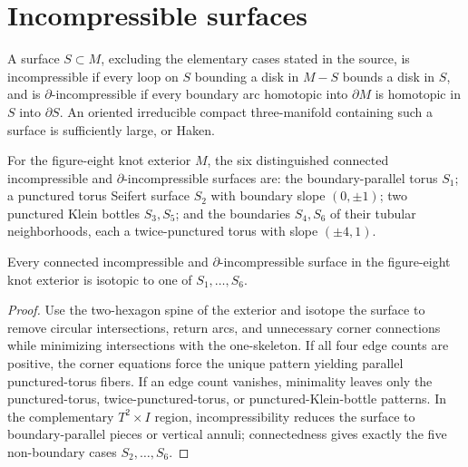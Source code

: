 \section{Incompressible surfaces}

\begin{definition}
\label{thurston-ch04-incompressibility}
A surface \(S\subset M\), excluding the elementary cases stated in the source, is incompressible if every loop on \(S\) bounding a disk in \(M-S\) bounds a disk in \(S\), and is \(\partial\)-incompressible if every boundary arc homotopic into \(\partial M\) is homotopic in \(S\) into \(\partial S\). An oriented irreducible compact three-manifold containing such a surface is sufficiently large, or Haken.

\end{definition}

\begin{proposition}
\label{thurston-ch04-figure-eight-essential-surfaces}
For the figure-eight knot exterior \(M\), the six distinguished connected incompressible and \(\partial\)-incompressible surfaces are: the boundary-parallel torus \(S_1\); a punctured torus Seifert surface \(S_2\) with boundary slope \((0,\pm1)\); two punctured Klein bottles \(S_3,S_5\); and the boundaries \(S_4,S_6\) of their tubular neighborhoods, each a twice-punctured torus with slope \((\pm4,1)\).

\end{proposition}

\begin{theorem}
\label{thurston-ch04-essential-surface-classification}
Every connected incompressible and \(\partial\)-incompressible surface in the figure-eight knot exterior is isotopic to one of \(S_1,\ldots,S_6\).

\end{theorem}

\begin{proof}
\sketch Use the two-hexagon spine of the exterior and isotope the surface to remove circular intersections, return arcs, and unnecessary corner connections while minimizing intersections with the one-skeleton. If all four edge counts are positive, the corner equations force the unique pattern yielding parallel punctured-torus fibers. If an edge count vanishes, minimality leaves only the punctured-torus, twice-punctured-torus, or punctured-Klein-bottle patterns. In the complementary \(T^2\times I\) region, incompressibility reduces the surface to boundary-parallel pieces or vertical annuli; connectedness gives exactly the five non-boundary cases \(S_2,\ldots,S_6\).
\end{proof}

